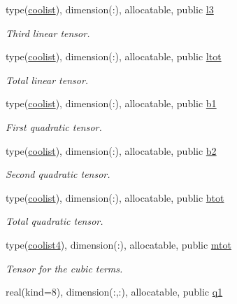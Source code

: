 \begin{DoxyCompactItemize}
type(\hyperlink{structtensor_1_1coolist}{coolist}), dimension(\+:), allocatable, public \hyperlink{namespacemtv__int__tensor_a04155fe5ee1b9580674140eab208a7bc}{l3}
\begin{DoxyCompactList}\small\item\em Third linear tensor. \end{DoxyCompactList}\item 
type(\hyperlink{structtensor_1_1coolist}{coolist}), dimension(\+:), allocatable, public \hyperlink{namespacemtv__int__tensor_ace2795d6c48885b8f847384747e8ad5d}{ltot}
\begin{DoxyCompactList}\small\item\em Total linear tensor. \end{DoxyCompactList}\item 
type(\hyperlink{structtensor_1_1coolist}{coolist}), dimension(\+:), allocatable, public \hyperlink{namespacemtv__int__tensor_a0220ca0d7f49bf405e6848492ec24995}{b1}
\begin{DoxyCompactList}\small\item\em First quadratic tensor. \end{DoxyCompactList}\item 
type(\hyperlink{structtensor_1_1coolist}{coolist}), dimension(\+:), allocatable, public \hyperlink{namespacemtv__int__tensor_a71cc55d84fa25e49c9886d5ac9fc5032}{b2}
\begin{DoxyCompactList}\small\item\em Second quadratic tensor. \end{DoxyCompactList}\item 
type(\hyperlink{structtensor_1_1coolist}{coolist}), dimension(\+:), allocatable, public \hyperlink{namespacemtv__int__tensor_a888f93868eeb459582a5acc909a33374}{btot}
\begin{DoxyCompactList}\small\item\em Total quadratic tensor. \end{DoxyCompactList}\item 
type(\hyperlink{structtensor_1_1coolist4}{coolist4}), dimension(\+:), allocatable, public \hyperlink{namespacemtv__int__tensor_a3722af69dcc509f4e7d24f898a7e68ae}{mtot}
\begin{DoxyCompactList}\small\item\em Tensor for the cubic terms. \end{DoxyCompactList}\item 
real(kind=8), dimension(\+:,\+:), allocatable, public \hyperlink{namespacemtv__int__tensor_a2677249c594dbc196d1554e751257d1c}{q1}

\end{DoxyCompactItemize}
